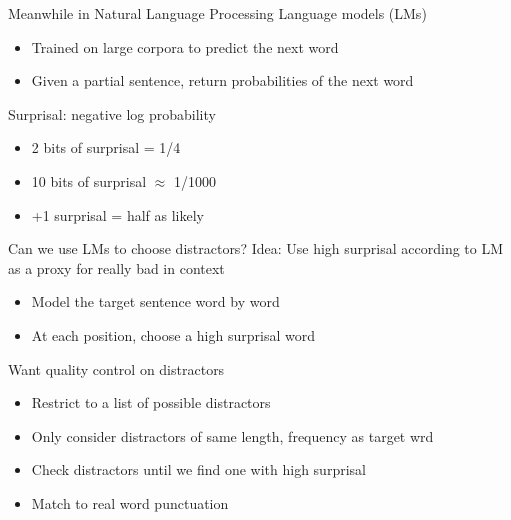 \documentclass[12pt, xcolor=beamer,table,usenames,dvipsnames, ignorenonframetext, ngerman]{beamer}
\begin{document}
\begin{frame}{Meanwhile in Natural Language Processing}
\pause
Language models (LMs)
\begin{itemize}
	\item Trained on large corpora to predict the next word
	\item Given a partial sentence, return probabilities of the next word
\end{itemize}
\pause
Surprisal: negative log probability
\begin{itemize}
	\item 2 bits of surprisal = 1/4
	\item 10 bits of surprisal $\approx$ 1/1000 
	\item +1 surprisal = half as likely
\end{itemize}
\pause
{}
\end{frame}

\begin{frame}{Can we use LMs to choose distractors?} Idea: Use high surprisal according to LM as a proxy for really bad in context
\medskip

\pause

\begin{itemize}
	\item Model the target sentence word by word \pause
	\item At each position, choose a high surprisal word
\end{itemize}
\medskip
\pause
Want quality control on distractors
\pause
\begin{itemize}
	\item Restrict to a list of possible distractors
	\item Only consider distractors of same length, frequency as target wrd
	\item Check distractors until we find one with high surprisal
	\item Match to real word punctuation
\end{itemize}

\end{frame}
\end{document}
